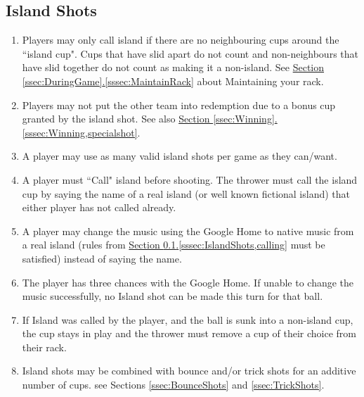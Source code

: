 	\subsection{Island Shots}\label{ssec:IslandShots}
		\begin{enumerate}[label=(\roman*)]
            \item \label{sssec:IslandShots,conditon} Players may only call island if there are no neighbouring cups around the ``island cup".
                Cups that have slid apart do not count and non-neighbours that have slid together do not count as making it a non-island.
                See \hyperref[sssec:MaintainRack]{Section \ref{ssec:DuringGame}.\ref{sssec:MaintainRack}} about Maintaining your rack.
            \item \label{sssec:IslandShots,winning} Players may not put the other team into redemption due to a bonus cup granted by the island shot.
                See also \hyperref[sssec:Winning,specialshot]{Section \ref{ssec:Winning}.\ref{sssec:Winning,specialshot}}.
            \item \label{sssec:IslandShots,times} A player may use as many valid island shots per game as they can/want.
            \item \label{sssec:IslandShots,calling} A player must ``Call" island before shooting.
                The thrower must call the island cup by saying the name of a real island (or well known fictional island) that either player has not called already.
            \item \label{sssec:IslandShots,musicCalling} A player may change the music using the Google Home to native music from a real island (rules from \hyperref[sssec:IslandShots,calling]{Section \ref{ssec:IslandShots}.\ref{sssec:IslandShots,calling}} must be satisfied) instead of saying the name.
            \item \label{sssec:IslandShots,musicAttempts} The player has three chances with the Google Home. If unable to change the music successfully, no Island shot can be made this turn for that ball.
            \item \label{sssec:IslandShots,missincup} If Island was called by the player, and the ball is sunk into a non-island cup, the cup stays in play and the thrower must remove a cup of their choice from their rack.	
            \item \label{sssec:IslandShots,combo} Island shots may be combined with bounce and/or trick shots for an additive number of cups.
                see Sections \ref{ssec:BounceShots} and \ref{ssec:TrickShots}.

\end{enumerate}
